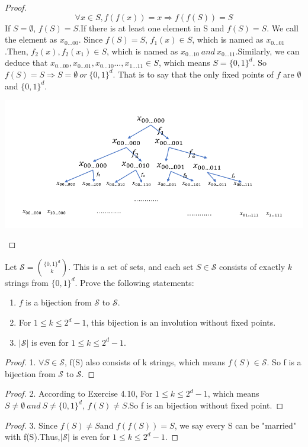 \begin{proof}
\[\forall x \in S, f(f(x)) = x \Rightarrow f(f(S))=S\]
If $S= \emptyset$, $f(S)=S$.If there is at least one element in S and $f(S)=S$. We call the element as $x_{0\ldots 00}$. Since $f(S) = S$, $f_1(x) \in S$, which is named as $x_{0\ldots 01}$.Then, $f_2(x), f_2(x_1) \in S$, which is named as $x_{0\ldots 10} \: and\: x_{0\ldots 11}$.Similarly, we can deduce that $x_{0\ldots 00},x_{0\ldots01},x_{0\ldots 10}\ldots ,x_{1\ldots 11} \in S$, which means $S = \{0,1\}^d$. So $f(S)=S \Rightarrow S=\emptyset \: or\: \{0,1\}^d$. That is to say that the only fixed points of $f$ are $\emptyset$ and $\{0,1\}^d$.
\begin{center}
\includegraphics[scale=0.8]{10.png} 
\end{center}
\end{proof}

\begin{exercise}
   Let $\mathcal{S} = { \{0,1\}^d \choose k }$. This is a set of sets, and each set $S \in \mathcal{S}$
   consists of exactly $k$ strings from $\{0,1\}^d$. Prove the following statements: 
   \begin{enumerate}
   \item $f$ is a bijection from $\mathcal{S}$ to $\mathcal{S}$.
   \item For $1 \leq k \leq 2^d-1$, this bijection is an involution
   without fixed points.
   \item $|\mathcal{S}|$ is even for $1 \leq k \leq 2^d-1$.
   \end{enumerate}
\end{exercise}

\begin{proof}
1. $\forall S \in \mathcal{S}$, f(S) also consists of k strings, which means $f(S) \in \mathcal{S}$. So f is a bijection from $\mathcal{S}$ to $\mathcal{S}$.
\end{proof}

\begin{proof}
2. According to Exercise 4.10, For $1 \leq k \leq 2^d-1$, which means $S \neq \emptyset \: and\: S \neq \{0,1\}^d$, $f(S) \neq S$.So f is an bijection without fixed point.
\end{proof}

\begin{proof}
3. Since $f(S)\neq S$and $f(f(S))=S$, we say every S can be "married" with f(S).Thus,$|\mathcal{S}|$ is even for $1 \leq k \leq 2^d-1$.
\end{proof}

